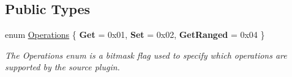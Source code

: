 \subsection*{Public Types}
\begin{DoxyCompactItemize}
\item 
\hypertarget{classAbstractSource_aad1e5e4914f2aa174dfd8fa6e143c1b9}{enum \hyperlink{classAbstractSource_aad1e5e4914f2aa174dfd8fa6e143c1b9}{Operations} \{ {\bfseries Get} = 0x01, 
{\bfseries Set} = 0x02, 
{\bfseries Get\+Ranged} = 0x04
 \}}\label{classAbstractSource_aad1e5e4914f2aa174dfd8fa6e143c1b9}

\begin{DoxyCompactList}\small\item\em The Operations enum is a bitmask flag used to specify which operations are supported by the source plugin. \end{DoxyCompactList}\end{DoxyCompactItemize}
